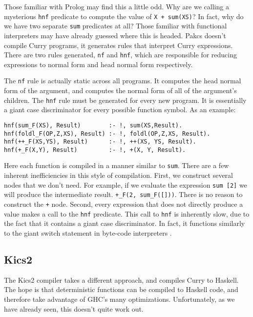 Those familiar with Prolog may find this a little odd.
Why are we calling a mysterious \texttt{hnf} predicate to compute the value of \texttt{X + sum(XS)}?
In fact, why do we have two separate \texttt{sum} predicates at all?
Those familiar with functional interpreters may have already guessed where this is headed.
Pakcs doesn't compile Curry programs, it generates rules that interpret Curry expressions.
There are two rules generated, \texttt{nf} and \texttt{hnf}, which are responsible for reducing expressions
to normal form and head normal form respectively.

The \texttt{nf} rule is actually static across all programs.
It computes the head normal form of the argument,
and computes the normal form of all of the argument's children.
The \texttt{hnf} rule must be generated for every new program.
It is essentially a giant case discriminator for every possible function symbol.
As an example:

\begin{verbatim}
hnf(sum_F(XS), Result)        :- !, sum(XS,Result).
hnf(foldl_F(OP,Z,XS), Result) :- !, foldl(OP,Z,XS, Result).
hnf(++_F(XS,YS), Result)      :- !, ++(XS, YS, Result).
hnf(+_F(X,Y), Result)         :- !, +(X, Y, Result).
\end{verbatim}

Here each function is compiled in a manner similar to \texttt{sum}.
There are a few inherent inefficiencies in this style of compilation.
First, we construct several nodes that we don't need.
For example, if we evaluate the expression \texttt{sum [2]} we will produce the intermediate result.
\texttt{+\_F(2, sum\_F([]))}.
There is no reason to construct the \texttt + node.
Second, every expression that does not directly produce a value
makes a call to the \texttt{hnf} predicate.
This call to \texttt{hnf} is inherently slow,
due to the fact that it contains a giant case discriminator.
In fact, it functions similarly to the giant switch
statement in byte-code interpreters \cite{vmSwitch}.


\subsection{Kics2}

The Kics2 compiler takes a different approach, and compiles Curry to Haskell.
The hope is that deterministic functions can be compiled to Haskell code,
and therefore take advantage of GHC's many optimizations.
Unfortunately, as we have already seen, this doesn't quite work out.

